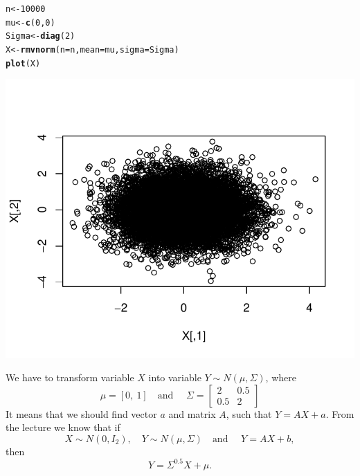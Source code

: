 \documentclass[12pt, a4paper]{article}\usepackage[]{graphicx}\usepackage[]{color}
\makeatletter
\def\maxwidth{ %
  \ifdim\Gin@nat@width>\linewidth
    \linewidth
  \else
    \Gin@nat@width
  \fi
}
\newcommand{\hlnum}[1]{\textcolor[rgb]{0.686,0.059,0.569}{#1}}%
\newcommand{\hlstd}[1]{\textcolor[rgb]{0.345,0.345,0.345}{#1}}%
\newcommand{\hlkwb}[1]{\textcolor[rgb]{0.69,0.353,0.396}{#1}}%
\newcommand{\hlkwc}[1]{\textcolor[rgb]{0.333,0.667,0.333}{#1}}%
\newcommand{\hlkwd}[1]{\textcolor[rgb]{0.737,0.353,0.396}{\textbf{#1}}}%
\newenvironment{kframe}{%
 \def\at@end@of@kframe{}%
 \ifinner\ifhmode%
  \def\at@end@of@kframe{\end{minipage}}%
  \begin{minipage}{\columnwidth}%
 \fi\fi%
 \def\FrameCommand##1{\hskip\@totalleftmargin \hskip-\fboxsep
 \colorbox{shadecolor}{##1}\hskip-\fboxsep
     \hskip-\linewidth \hskip-\@totalleftmargin \hskip\columnwidth}%
 \MakeFramed {\advance\hsize-\width
   \@totalleftmargin\z@ \linewidth\hsize
   \@setminipage}}%
 {\par\unskip\endMakeFramed%
 \at@end@of@kframe}
\newenvironment{knitrout}{}{} %
\makeatother
\begin{document}
\begin{knitrout}
\color{fgcolor}\begin{kframe}
\begin{alltt}
\hlstd{n} \hlkwb{<-} \hlnum{10000}
\hlstd{mu} \hlkwb{<-} \hlkwd{c}\hlstd{(}\hlnum{0}\hlstd{,} \hlnum{0}\hlstd{)}
\hlstd{Sigma} \hlkwb{<-} \hlkwd{diag}\hlstd{(}\hlnum{2}\hlstd{)}
\hlstd{X} \hlkwb{<-} \hlkwd{rmvnorm}\hlstd{(}\hlkwc{n} \hlstd{= n,} \hlkwc{mean} \hlstd{= mu,} \hlkwc{sigma} \hlstd{=  Sigma)}
\hlkwd{plot}\hlstd{(X)}
\end{alltt}
\end{kframe}

{\centering \includegraphics[width=\maxwidth]{figure/ex2X-1} 

}



\end{knitrout}

We have to transform variable $X$ into variable $Y \sim N(\mu, \Sigma)$, where 
\[\mu = \left[0,\ 1\right] \quad \text{and }\quad 
  \Sigma = \left[
    \begin{matrix}  
      2   & 0.5 \\
      0.5 & 2
    \end{matrix} 
    \right]
\]
It means that we should find vector $a$ and matrix $A$, such that $Y=A X + a$. From the lecture we know that if 
\[ X\sim N(0, I_2), \quad Y\sim N(\mu, \Sigma) \quad \text{and }\quad Y = AX + b,\] 
then 
\[Y = \Sigma^{0.5}X + \mu. \] 
\end{document}
